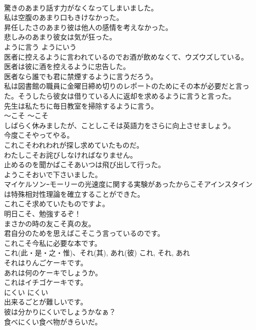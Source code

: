 \documentclass[8pt]{extreport}
\begin{document}
\begin{CJK}{UTF8}{min}
\\	驚きのあまり話す力がなくなってしまいました。   
\\	私は空腹のあまり口もきけなかった。   
\\	昇任したさのあまり彼は他人の感情を考えなかった。   
\\	悲しみのあまり彼女は気が狂った。  
\\	ように言う	ようにいう	
\\	医者に控えるように言われているのでお酒が飲めなくて、ウズウズしている。  
\\	医者は彼に酒を控えるように忠告した。  
\\	医者なら誰でも君に禁煙するように言うだろう。  
\\	私は図書館の職員に金曜日締め切りのレポートのためにその本が必要だと言った。そうしたら彼女は借りている人に返却を求めるように言うと言った。   
\\	先生は私たちに毎日教室を掃除するように言う。  
\\	〜こそ	〜こそ	
\\	しばらく休みましたが、ことしこそは英語力をさらに向上させましょう。  
\\	今度こそやってやる。  
\\	これこそわれわれが探し求めていたものだ。  
\\	わたしこそお詫びしなければなりません。  
\\	止めるのを聞かばこそあいつは飛び出して行った。  
\\	ようこそおいで下さいました。  
\\	マイケルソンｰモーリーの光速度に関する実験があったからこそアインスタインは特殊相対性理論を確立することができた。  
\\	これこそ求めていたものですよ。  
\\	明日こそ、勉強するぞ！
\\	まさかの時の友こそ真の友。   
\\	君自分のためを思えばこそこう言っているのです。  
\\	これこそ今私に必要な本です。  
\\	これ(此・是・之・惟)、それ(其), あれ(彼)	これ, それ, あれ	
\\	それはりんごケーキです。
\\	あれは何のケーキでしょうか。
\\	これはイチゴケーキです。
\\	にくい	にくい	
\\	出来るごとが難しいです。	
\\	彼は分かりにくいでしょうかなぁ？   
\\	食べにくい食べ物がきらいだ。  

\end{CJK}
\end{document}
